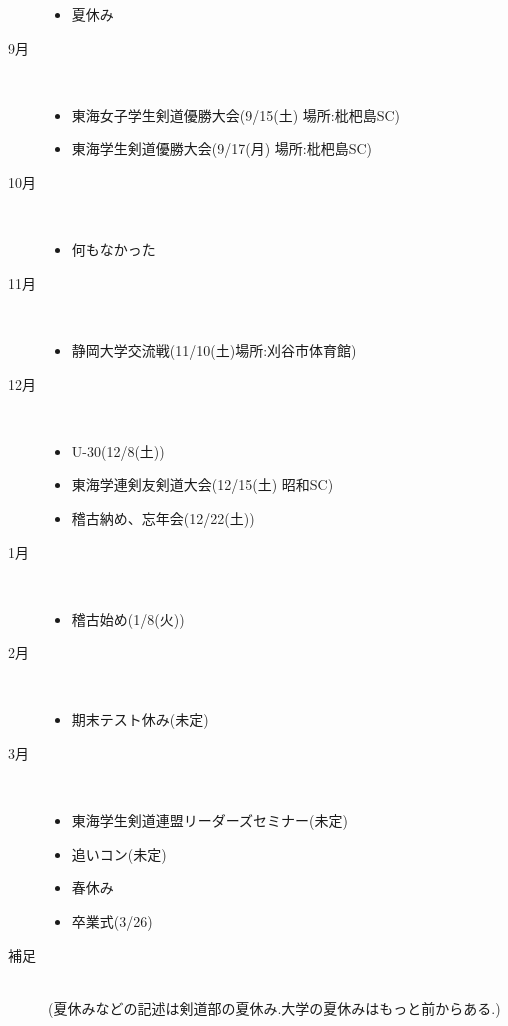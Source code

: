 \documentclass[12pt]{report}
\begin{document}
\begin{description}
\begin{itemize}
    \item 夏休み
\end{itemize}
\newpage
\item[9月]~\\
\begin{itemize}
    \item 東海女子学生剣道優勝大会(9/15(土) 場所:枇杷島SC)
    \item 東海学生剣道優勝大会(9/17(月) 場所:枇杷島SC)
\end{itemize}
\item[10月]~\\
\begin{itemize}
    \item 何もなかった
\end{itemize}
\item[11月]~\\
\begin{itemize}
    \item 静岡大学交流戦(11/10(土)場所:刈谷市体育館)
\end{itemize}
\item[12月]~\\
\begin{itemize}
    \item U-30(12/8(土))
    \item 東海学連剣友剣道大会(12/15(土) 昭和SC)
    \item 稽古納め、忘年会(12/22(土))
\end{itemize}
\item[1月]~\\
\begin{itemize}
    \item 稽古始め(1/8(火))
\end{itemize}
\item[2月]~\\
\begin{itemize}
    \item 期末テスト休み(未定)
\end{itemize}
\newpage
\item[3月]~\\
\begin{itemize}
    \item 東海学生剣道連盟リーダーズセミナー(未定)
    \item 追いコン(未定)
    \item 春休み
    \item 卒業式(3/26)
\end{itemize}
\item[補足]~\\
(夏休みなどの記述は剣道部の夏休み.大学の夏休みはもっと前からある.)
\end{description}
\end{document}
